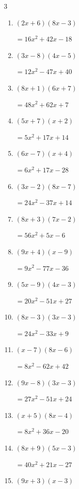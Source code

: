 \begin{multicols}{3}
\begin{enumerate}
        $=81x^{2}-81x+14$

\columnbreak %

  \item $(2x+6)(8x-3)$

        $=16x^{2}+42x-18$

  \item $(3x-8)(4x-5)$

        $=12x^{2}-47x+40$

  \item $(8x+1)(6x+7)$

        $=48x^{2}+62x+7$

  \item $(5x+7)(x+2)$

        $=5x^{2}+17x+14$

  \item $(6x-7)(x+4)$

        $=6x^{2}+17x-28$

  \item $(3x-2)(8x-7)$

        $=24x^{2}-37x+14$

  \item $(8x+3)(7x-2)$

        $=56x^{2}+5x-6$

  \item $(9x+4)(x-9)$

        $=9x^{2}-77x-36$

  \item $(5x-9)(4x-3)$

        $=20x^{2}-51x+27$

  \item $(8x-3)(3x-3)$

        $=24x^{2}-33x+9$

  \item $(x-7)(8x-6)$

        $=8x^{2}-62x+42$

  \item $(9x-8)(3x-3)$

        $=27x^{2}-51x+24$

  \item $(x+5)(8x-4)$

        $=8x^{2}+36x-20$

  \item $(8x+9)(5x-3)$

        $=40x^{2}+21x-27$

  \item $(9x+3)(x-3)$


\end{enumerate}
\end{multicols}
